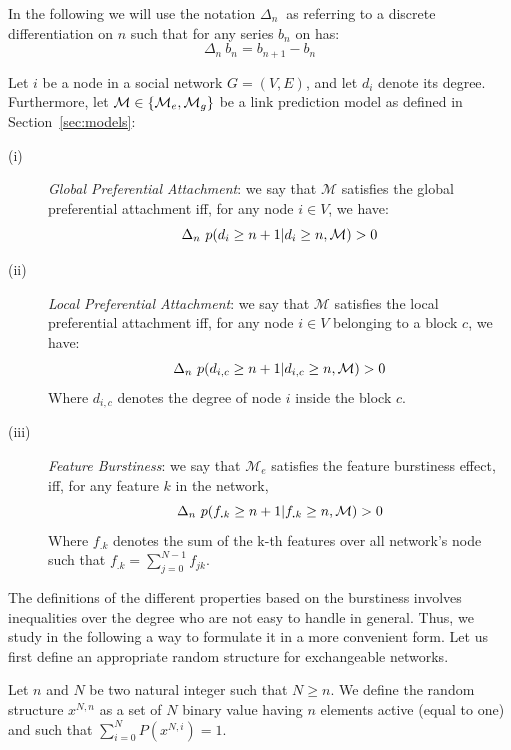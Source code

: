 In the following we will use the notation $\Delta_n\ $ as referring to a discrete differentiation on $n$ such that for any series $b_n$ on has:
\begin{equation*}
    \Delta_n\  b_n = b_{n+1} - b_n
\end{equation*}


\begin{definition}
Let $i$ be a node in a social network $G=(V,E)$, and let $d_i$ denote its degree. Furthermore, let $\mathcal{M} \in \{\mathcal{M}_e, \mathcal{M}_g\}$ be a link prediction model as defined in Section~\ref{sec:models}: 
\begin{description}
\item[(i)] \emph{Global Preferential Attachment}: we say that $\mathcal{M}$ satisfies the global preferential attachment iff, for any node $i \in V$, we have:
 \begin{equation}
 \Delta_n\  p(d_i \geq n+1 | d_i \geq n,  \mathcal{M}) > 0
 \end{equation}
\item[(ii)] \emph{Local Preferential Attachment}: we say that $\mathcal{M}$ satisfies the local preferential attachment iff, for any node $i \in V$  belonging to a block $c$, we have:
  \begin{equation}
 \Delta_n\  p(d_{i,c} \geq n+1 | d_{i,c} \geq n,  \mathcal{M}) > 0
 \end{equation}
  Where $d_{i,c}$ denotes the degree of node $i$ inside the block $c$.
\item[(iii)] \emph{Feature Burstiness}: we say that $\mathcal{M}_e$ satisfies the feature burstiness effect, iff, for any feature $k$ in the network,   
  \begin{equation}
	\Delta_n\  p(f_{\bm{.}k} \geq n+1 | f_{\bm{.}k} \geq n,  \mathcal{M}) > 0
  \end{equation}
   Where $f_{\bm{.}k}$ denotes the sum of the k-th features over all network's node such that $f_{\bm{.}k} = \sum_{j=0}^{N-1} f_{jk}$.
\end{description}
\label{def:burst-soc-net}
\end{definition}
%
The definitions of the different properties based on the burstiness involves inequalities over the degree who are not easy to handle in general. Thus, we study in the following a way to formulate it in a more convenient form. Let us first define an appropriate random structure for exchangeable networks.

\begin{definition}
	Let $n$ and $N$ be two natural integer such that $N \geq n$. We define the random structure $x^{N,n}$ as a set of $N$ binary value having $n$ elements active (equal to one) and such that $\sum_{i=0}^N P(x^{N,i}) = 1$.
	\label{def:rd_struct}
\end{definition}

